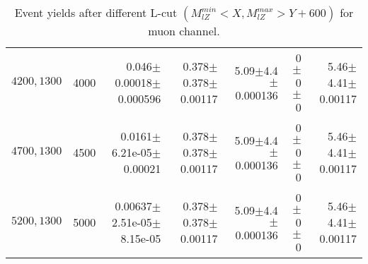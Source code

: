\documentclass[]{article}
\begin{document}
\begin{table}
\begin{center}
{\begin{tabular}{ |r|r|r|r|r|r|r|}
$4200,1300$ & 4000 & 0.046$\pm$0.00018$\pm$0.000596 & 0.378$\pm$0.378$\pm$0.00117 & 5.09$\pm$4.4$\pm$0.000136 & 0$\pm$0$\pm$0 & 5.46$\pm$4.41$\pm$0.00117 \\
$4700,1300$ & 4500 & 0.0161$\pm$6.21e-05$\pm$0.00021 & 0.378$\pm$0.378$\pm$0.00117 & 5.09$\pm$4.4$\pm$0.000136 & 0$\pm$0$\pm$0 & 5.46$\pm$4.41$\pm$0.00117 \\
$5200,1300$ & 5000 & 0.00637$\pm$2.51e-05$\pm$8.15e-05 & 0.378$\pm$0.378$\pm$0.00117 & 5.09$\pm$4.4$\pm$0.000136 & 0$\pm$0$\pm$0 & 5.46$\pm$4.41$\pm$0.00117 \\
\hline 
\end{tabular}
}
\end{center}
\caption{Event yields after different L-cut $(M_{lZ}^{min} < X, M_{lZ}^{max} > Y + 600)$ for muon channel.}
\end{table}
\end{document}
